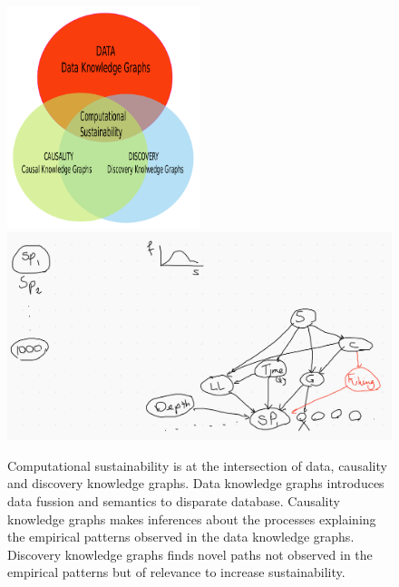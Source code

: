 \documentclass[12pt,a4paper]{article}
\begin{document}
\vspace{-0.5 in}
\begin{figure}[H]
	 \centering
	 \includegraphics[width = 0.5\textwidth]{Fig0.pdf}\\
	 \includegraphics[width = 1\textwidth]{Fig1BN.png}
	 \caption{Computational sustainability is at the intersection of data, causality and discovery knowledge graphs. Data knowledge graphs introduces data fussion and semantics to disparate database. Causality knowledge graphs makes inferences about the processes explaining the empirical patterns observed in the data knowledge graphs. Discovery knowledge graphs finds novel paths not observed in the empirical patterns but of relevance to increase sustainability.}
\end{figure}   
\end{document}
